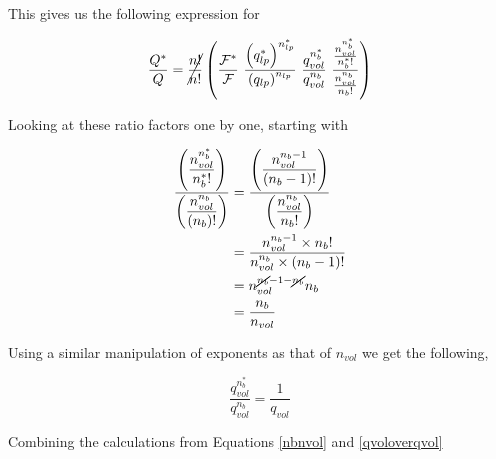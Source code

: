 \documentclass[12pt,letterpaper]{article}
\newcommand{\lr}[1]{\left( #1 \right)}
\newcommand{\fop}{\ensuremath{\mathcal{F}}}
\begin{document}
This gives us the following expression for     

\begin{equation}
\frac{
        Q^{*}
}{
	    Q
}
=
    \cancel{
    	\frac{
    	    n!
    	}{
    	    n!
    	}
    }
	\left(
	    \frac{
	        \fop^{*}
	    }{
	        \fop
	    }
	    ~
	    \frac{
	        \lr{
	            q_{lp}^{*}
	        }
	        ^{
    	        n_{lp}^{*}
    	    }
	    }{
	        \lr{
	            q_{lp}	        
    	    }
    	    ^{
    	        n_{lp}
    	    }
	    }
	    ~
	    \frac{
    	    q_{vol}^{n_{b}^{*}}
    	}{
    	    q_{vol}^{n_{b}}
    	}
    	~
    	\frac{
    		\frac{
    			n_{vol}^{n_{b}^{*}}
    		}{
    			n_b^{*}!
    		}
		}{	
    		\frac{
    			n_{vol}^{n_{b}}
    		}{
    			n_b!
    		}
		}
	\right)
	\label{Eq: RatQ}
\end{equation}


Looking at these ratio factors one by one, starting with


\begin{align}
\label{nbnvol}
    \frac{
        \lr{\displaystyle
        		\frac{
        			n_{vol}^{n_{b}^{*}}
        		}{
        			n_b^{*}!
        		}
        }
    }{
        \lr{\displaystyle
        		\frac{
        			n_{vol}^{n_{b}}
        		}{
        		    \lr{
        			    n_b
        		    }!
        		}
        	}
    }\nonumber
    &=
	\frac{
	    \lr{
	        \displaystyle
    		\frac{
    			n_{vol}^{n_{b}-1}
    		}{
    			(n_b-1)!
    		}
		}
	}{
		\lr{
		    \displaystyle	
    		\frac{
    			n_{vol}^{n_{b}}
    		}{
    			n_b!
    		}
    	}	
	}\\
	&=
	\frac{
        n_{vol}^{n_{b}-1} 
    	\times
    	n_b!
    }{
	    n_{vol}^{n_{b}}
		\times
		(n_b-1)!
	}\\
	&=
	n_{vol}^{\cancel{n_{b}}-1-\cancel{n_{b}}} 
	n_b\nonumber\\
	&=
	\frac{
	    n_b
	}{
	    n_{vol} 
	}\nonumber
\end{align}

Using a similar manipulation of exponents as that of $n_{vol}$ we get the following,

\begin{equation}
\frac{
    	    q_{vol}^{n_{b}^{*}}
    	}{
    	    q_{vol}^{n_{b}}
}
=
\frac{
    1
}{
    q_{vol}
}
\label{qvoloverqvol}
\end{equation}

Combining the calculations from Equations \ref{nbnvol} and \ref{qvoloverqvol}
\end{document}
